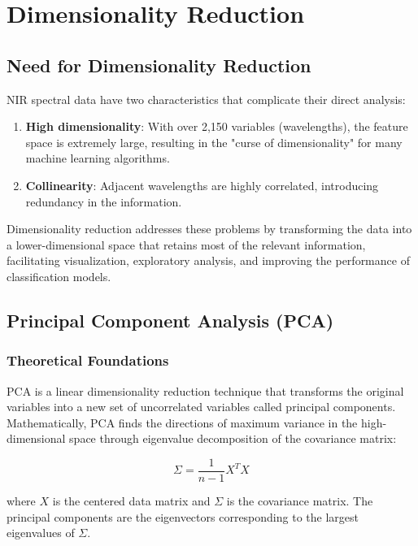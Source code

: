 \documentclass[12pt,a4paper]{article}
\begin{document}
\newpage
\section{Dimensionality Reduction}
\label{sec:dimreduction}

\subsection{Need for Dimensionality Reduction}

NIR spectral data have two characteristics that complicate their direct analysis:

\begin{enumerate}
    \item \textbf{High dimensionality}: With over 2,150 variables (wavelengths), the feature space is extremely large, resulting in the "curse of dimensionality" for many machine learning algorithms.
    \item \textbf{Collinearity}: Adjacent wavelengths are highly correlated, introducing redundancy in the information.
\end{enumerate}

Dimensionality reduction addresses these problems by transforming the data into a lower-dimensional space that retains most of the relevant information, facilitating visualization, exploratory analysis, and improving the performance of classification models.

\subsection{Principal Component Analysis (PCA)}

\subsubsection{Theoretical Foundations}

PCA is a linear dimensionality reduction technique that transforms the original variables into a new set of uncorrelated variables called principal components. Mathematically, PCA finds the directions of maximum variance in the high-dimensional space through eigenvalue decomposition of the covariance matrix:

\begin{equation}
\Sigma = \frac{1}{n-1}X^T X
\end{equation}

where $X$ is the centered data matrix and $\Sigma$ is the covariance matrix. The principal components are the eigenvectors corresponding to the largest eigenvalues of $\Sigma$.
\end{document}
